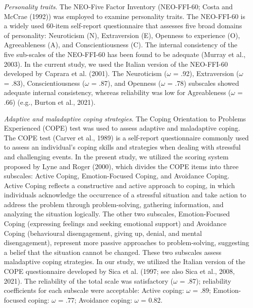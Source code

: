 \documentclass[
  man]{apa7}
\begin{document}
\emph{Personality traits}. The NEO-Five Factor Inventory (NEO-FFI-60; Costa and McCrae (1992)) was employed to examine personality traits. The NEO-FFI-60 is a widely used 60-item self-report questionnaire that assesses five broad domains of personality: Neuroticism (N), Extraversion (E), Openness to experience (O), Agreeableness (A), and Conscientiousness (C). The internal consistency of the five sub-scales of the NEO-FFI-60 has been found to be adequate (Murray et al., 2003). In the current study, we used the Italian version of the NEO-FFI-60 developed by Caprara et al. (2001). The Neuroticism (\(\omega\) = .92), Extraversion (\(\omega\) = .83), Conscientiousness (\(\omega\) = .87), and Openness (\(\omega\) = .78) subscales showed adequate internal consistency, whereas reliability was low for Agreableness (\(\omega\) = .66) (e.g., Burton et al., 2021).

\emph{Adaptive and maladaptive coping strategies}. The Coping Orientation to Problems Experienced (COPE) test was used to assess adaptive and maladaptive coping. The COPE test (Carver et al., 1989) is a self-report questionnaire commonly used to assess an individual's coping skills and strategies when dealing with stressful and challenging events. In the present study, we utilized the scoring system proposed by Lyne and Roger (2000), which divides the COPE items into three subscales: Active Coping, Emotion-Focused Coping, and Avoidance Coping. Active Coping reflects a constructive and active approach to coping, in which individuals acknowledge the occurrence of a stressful situation and take action to address the problem through problem-solving, gathering information, and analyzing the situation logically. The other two subscales, Emotion-Focused Coping (expressing feelings and seeking emotional support) and Avoidance Coping (behavioural disengagement, giving up, denial, and mental disengagement), represent more passive approaches to problem-solving, suggesting a belief that the situation cannot be changed. These two subscales assess maladaptive coping strategies. In our study, we utilized the Italian version of the COPE questionnaire developed by Sica et al. (1997; see also Sica et al., 2008, 2021). The reliability of the total scale was satisfactory (\(\omega\) = .87); reliability coefficients for each subscale were acceptable: Active coping: \(\omega\) = .89; Emotion-focused coping: \(\omega\) = .77; Avoidance coping: \(\omega\) = 0.82.
\end{document}
